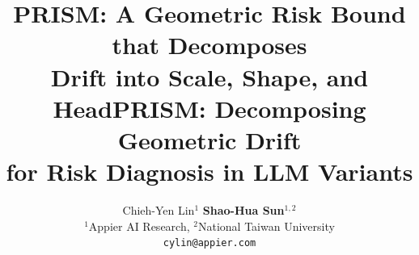 \documentclass{article} %
\title{PRISM\prismlogo: A Geometric Risk Bound that Decomposes \\
Drift into Scale, Shape, and Head}
\title{PRISM\prismlogo: Decomposing Geometric Drift \\
for Risk Diagnosis in LLM Variants}
\author{
Chieh-Yen Lin$^{1}$ \quad
\textbf{Shao-Hua Sun$^{1,2}$}\\
  $^1$Appier AI Research, $^2$National Taiwan University \\
  \texttt{cylin@appier.com}
}
\author{%
}
\newif\ifarxiv
\begin{document}
\doparttoc %
\faketableofcontents %

\maketitle
\ifarxiv\lhead{Preprint. Under review.}\fi

\end{document}
